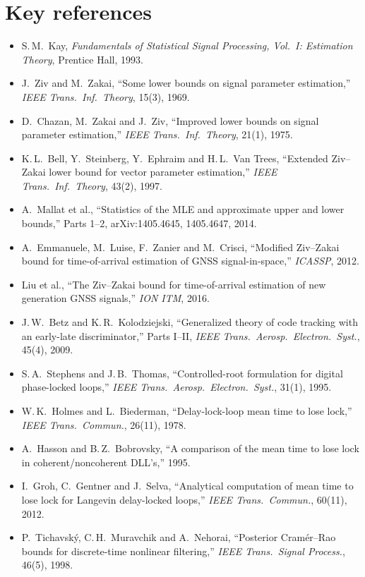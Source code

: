 \documentclass[11pt,a4paper]{article}
\begin{document}
\section{Key references}
\begin{itemize}
\item S.\,M.\ Kay, \emph{Fundamentals of Statistical Signal Processing, Vol.\ I: Estimation Theory}, Prentice Hall, 1993.
\item J.\ Ziv and M.\ Zakai, ``Some lower bounds on signal parameter estimation,'' \emph{IEEE Trans.\ Inf.\ Theory}, 15(3), 1969.
\item D.\ Chazan, M.\ Zakai and J.\ Ziv, ``Improved lower bounds on signal parameter estimation,'' \emph{IEEE Trans.\ Inf.\ Theory}, 21(1), 1975.
\item K.\,L.\ Bell, Y.\ Steinberg, Y.\ Ephraim and H.\,L.\ Van Trees, ``Extended Ziv--Zakai lower bound for vector parameter estimation,'' \emph{IEEE Trans.\ Inf.\ Theory}, 43(2), 1997.
\item A.\ Mallat et al., ``Statistics of the MLE and approximate upper and lower bounds,'' Parts 1--2, arXiv:1405.4645, 1405.4647, 2014.
\item A.\ Emmanuele, M.\ Luise, F.\ Zanier and M.\ Crisci, ``Modified Ziv--Zakai bound for time-of-arrival estimation of GNSS signal-in-space,'' \emph{ICASSP}, 2012.
\item Liu et al., ``The Ziv--Zakai bound for time-of-arrival estimation of new generation GNSS signals,'' \emph{ION ITM}, 2016.
\item J.\,W.\ Betz and K.\,R.\ Kolodziejski, ``Generalized theory of code tracking with an early-late discriminator,'' Parts I--II, \emph{IEEE Trans.\ Aerosp.\ Electron.\ Syst.}, 45(4), 2009.
\item S.\,A.\ Stephens and J.\,B.\ Thomas, ``Controlled-root formulation for digital phase-locked loops,'' \emph{IEEE Trans.\ Aerosp.\ Electron.\ Syst.}, 31(1), 1995.
\item W.\,K.\ Holmes and L.\ Biederman, ``Delay-lock-loop mean time to lose lock,'' \emph{IEEE Trans.\ Commun.}, 26(11), 1978.
\item A.\ Hasson and B.\,Z.\ Bobrovsky, ``A comparison of the mean time to lose lock in coherent/noncoherent DLL's,'' 1995.
\item I.\ Groh, C.\ Gentner and J.\ Selva, ``Analytical computation of mean time to lose lock for Langevin delay-locked loops,'' \emph{IEEE Trans.\ Commun.}, 60(11), 2012.
\item P.\ Tichavský, C.\,H.\ Muravchik and A.\ Nehorai, ``Posterior Cramér--Rao bounds for discrete-time nonlinear filtering,'' \emph{IEEE Trans.\ Signal Process.}, 46(5), 1998.

\end{itemize}
\end{document}
